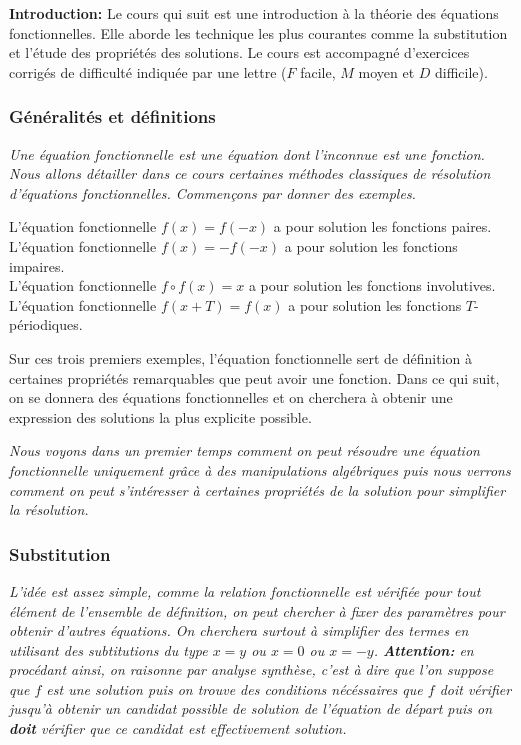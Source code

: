 \textbf{Introduction:} Le cours qui suit est une introduction à la théorie des équations fonctionnelles. Elle aborde les technique les plus courantes comme la substitution et l'étude des propriétés des solutions. Le cours est accompagné d'exercices corrigés de difficulté indiquée par une lettre ($F$ facile, $M$ moyen et $D$ difficile).

\subsubsection{Généralités et définitions}

\emph{Une équation fonctionnelle est une équation dont l'inconnue est une fonction. Nous allons détailler dans ce cours certaines méthodes classiques de résolution d'équations fonctionnelles. Commençons par donner des exemples.}
\begin{ex}
L'équation fonctionnelle $f(x)=f(-x)$ a pour solution les fonctions paires.
\\
L'équation fonctionnelle $f(x)=-f(-x)$ a pour solution les fonctions impaires.
\\
L'équation fonctionnelle $f\circ f(x)=x $ a pour solution les fonctions involutives.
\\
L'équation fonctionnelle $f(x+T)=f(x) $ a pour solution les fonctions $T$-périodiques.
\end{ex}

\begin{rem}
Sur ces trois premiers exemples, l'équation fonctionnelle sert de définition à certaines propriétés remarquables que peut avoir une fonction. Dans ce qui suit, on se donnera des équations fonctionnelles et on cherchera à obtenir une expression des solutions la plus explicite possible.
\end{rem}

\emph{Nous voyons dans un premier temps comment on peut résoudre une équation fonctionnelle uniquement grâce à des manipulations algébriques puis nous verrons comment on peut s'intéresser à certaines propriétés de la solution pour simplifier la résolution.}


\subsubsection{Substitution}

\emph{L'idée est assez simple, comme la relation fonctionnelle est vérifiée pour tout élément de l'ensemble de définition, on peut chercher à fixer des paramètres pour obtenir d'autres équations. On cherchera surtout à simplifier des termes en utilisant des subtitutions du type $x=y$ ou $x=0$ ou $x=-y$. \textbf{Attention:} en procédant ainsi, on raisonne par analyse synthèse, c'est à dire que l'on suppose que $f$ est une solution puis on trouve des conditions nécéssaires que $f$ doit vérifier jusqu'à obtenir un candidat possible de solution de l'équation de départ puis on \textbf{doit} vérifier que ce candidat est effectivement solution. }

